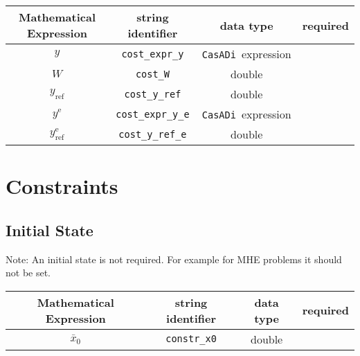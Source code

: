 \documentclass{article}
\newcommand{\code}[1]{\texttt{#1}}
\newcommand{\casadi}{\texttt{CasADi}}
\newcommand{\terminal}{^{\textrm{e}}}
\begin{document}
\begin{table}[h!]
	\centering
	\begin{tabular}{|c|c|c|c|}
		\toprule
		Mathematical Expression & string identifier & data type & required \\ \midrule
		$ y $ & \code{cost\_expr\_y}    & \casadi~expression  & \mandatory   \\ \midrule
		$ W $ & \code{cost\_W}    & double  & \mandatory   \\ \midrule
		$ y_{\textrm{ref}} $ & \code{cost\_y\_ref}    & double & \mandatory    \\ \midrule
		$ y\terminal $ & \code{cost\_expr\_y\_e}    & \casadi~expression  & \mandatory   \\ \midrule
		$ y_{\textrm{ref}}\terminal $ & \code{cost\_y\_ref\_e}    & double  & \mandatory   \\
		\bottomrule
	\end{tabular}
\end{table}
\section{Constraints}
\subsection{Initial State}
Note: An initial state is not required.
For example for MHE problems it should not be set.
\begin{table}[h]
	\centering
	\begin{tabular}{|c|c|c|c|}
		\toprule
		Mathematical Expression & string identifier & data type & required \\ \midrule
		$ \bar{x}_0 $ & \code{constr\_x0} & double & \optional \\ 		\bottomrule
	\end{tabular}
\end{table}
\end{document}
